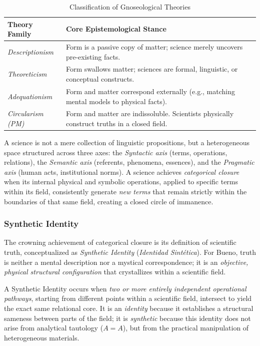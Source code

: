 \documentclass[11pt, a4paper]{article}
\begin{document}
\begin{table}[h!]  \footnotesize
\centering \caption{Classification of Gnoseological Theories} \vspace{0.2cm}
\begin{tabular}{ll} \toprule \textbf{Theory Family} & \textbf{Core Epistemological Stance} \\ \midrule \emph{Descriptionism}  & Form is a passive copy of matter; science merely uncovers pre-existing facts. \\ \emph{Theoreticism}   & Form swallows matter; sciences are formal, linguistic, or conceptual constructs. \\ \emph{Adequationism}  & Form and matter correspond externally (e.g., matching mental models to physical facts). \\ \emph{Circularism (PM)} & Form and matter are indissoluble. Scientists physically construct truths in a closed field. \\ \bottomrule
\end{tabular}
\end{table}


A science is not a mere collection of linguistic propositions, but a heterogeneous space structured across three axes: the \textit{Syntactic axis} (terms, operations, relations), the \textit{Semantic axis} (referents, phenomena, essences), and the \textit{Pragmatic axis} (human acts, institutional norms). A science achieves \textit{categorical closure} when its internal physical and symbolic operations, applied to specific terms within its field, consistently generate \emph{new terms} that remain strictly within the boundaries of that same field, creating a closed circle of immanence.

\subsubsection{Synthetic Identity}
The crowning achievement of categorical closure is its definition of scientific truth, conceptualized as \emph{Synthetic Identity} (\emph{Identidad Sintética}). For Bueno, truth is neither a mental description nor a mystical correspondence; it is an \emph{objective, physical structural configuration} that crystallizes within a scientific field.

A Synthetic Identity occurs when \emph{two or more entirely independent operational pathways}, starting from different points within a scientific field, intersect to yield the exact same relational core. It is an \emph{identity} because it establishes a structural sameness between parts of the field; it is \emph{synthetic} because this identity does not arise from analytical tautology (\(A = A\)), but from the practical manipulation of heterogeneous materials.
\end{document}
